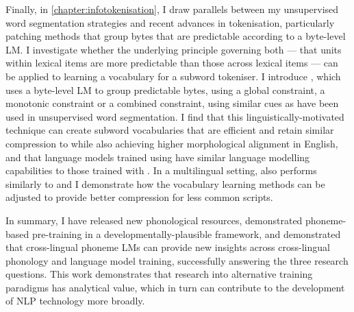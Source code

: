 Finally, in \cref{chapter:infotokenisation}, I draw parallels between my unsupervised word segmentation strategies and recent advances in tokenisation, particularly patching methods that group bytes that are predictable according to a byte-level LM. I investigate whether the underlying principle governing both --- that units within lexical items are more predictable than those across lexical items --- can be applied to learning a vocabulary for a subword tokeniser. I introduce \bytespan, which uses a byte-level LM to group predictable bytes, using a global constraint, a monotonic constraint or a combined constraint, using similar cues as have been used in unsupervised word segmentation. I find that this linguistically-motivated technique can create subword vocabularies that are efficient and retain similar compression to \bpe while also achieving higher morphological alignment in English, and that language models trained using \bytespan have similar language modelling capabilities to those trained with \bpe. In a multilingual setting, \bytespan also performs similarly to \bpe and I demonstrate how the vocabulary learning methods can be adjusted to provide better compression for less common scripts.

In summary, I have released new phonological resources, demonstrated phoneme-based pre-training in a developmentally-plausible framework, and demonstrated that cross-lingual phoneme LMs can provide new insights across cross-lingual phonology and language model training, successfully answering the three research questions. This work demonstrates that research into alternative training paradigms has analytical value, which in turn can contribute to the development of NLP technology more broadly. 




